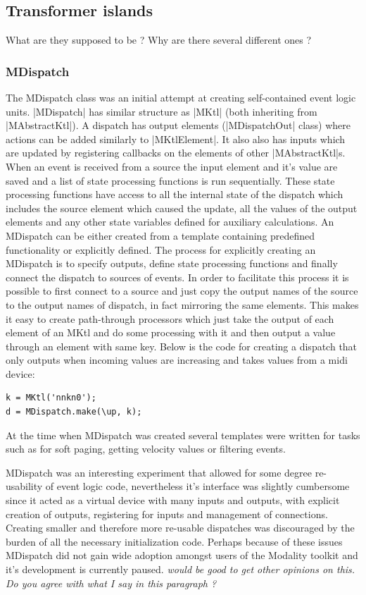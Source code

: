 \documentclass{article}
\begin{document}
\subsection{Transformer islands} 

What are they supposed to be ? Why are there several different ones ?	
	
\subsubsection{MDispatch}	

The MDispatch class was an initial attempt at creating self-contained event logic units. |MDispatch| has similar structure as |MKtl| (both inheriting from |MAbstractKtl|). A dispatch has output elements (|MDispatchOut| class) where actions can be added similarly to |MKtlElement|. It also also has inputs which are updated by registering callbacks on the elements of other |MAbstractKtl|s. When an event is received from a source the input element and it's value are saved and a list of state processing functions is run sequentially. These state processing functions have access to all the internal state of the dispatch which includes the source element which caused the update, all the values of the output elements and any other state variables defined for auxiliary calculations. An MDispatch can be either created from a template containing predefined functionality or explicitly defined. The process for explicitly creating an MDispatch is to specify outputs, define state processing functions and finally connect the dispatch to sources of events. In order to facilitate this process it is possible to first connect to a source and just copy the output names of the source to the output names of dispatch, in fact mirroring the same elements. This makes it easy to create path-through processors which just take the output of each element of an MKtl and do some processing with it and then output a value through an element with same key. Below is the code for creating a dispatch that only outputs when incoming values are increasing and takes values from a midi device:

\begin{Verbatim}
k = MKtl('nnkn0');
d = MDispatch.make(\up, k);
\end{Verbatim}

At the time when MDispatch was created several templates were written for tasks such as for soft paging, getting velocity values or filtering events. 

MDispatch was an interesting experiment that allowed for some degree re-usability of event logic code, nevertheless it's interface was slightly cumbersome since it acted as a virtual device with many inputs and outputs, with explicit creation of outputs, registering for inputs and management of connections. Creating smaller and therefore more re-usable dispatches was discouraged by the burden of all the necessary initialization code. Perhaps because of these issues MDispatch did not gain wide adoption amongst users of the Modality toolkit and it's development is currently paused. \emph{ would be good to get other opinions on this. Do you agree with what I say in this paragraph ? }
		
\end{document}
